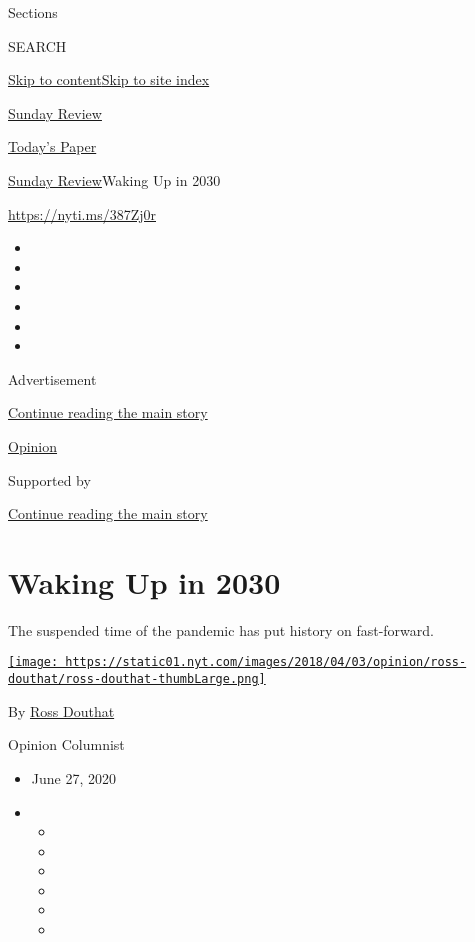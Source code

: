 Sections

SEARCH

\protect\hyperlink{site-content}{Skip to
content}\protect\hyperlink{site-index}{Skip to site index}

\href{https://www.nytimes.com/section/opinion/sunday}{Sunday Review}

\href{https://myaccount.nytimes.com/auth/login?response_type=cookie\&client_id=vi}{}

\href{https://www.nytimes.com/section/todayspaper}{Today's Paper}

\href{/section/opinion/sunday}{Sunday Review}\textbar{}Waking Up in 2030

\href{https://nyti.ms/387Zj0r}{https://nyti.ms/387Zj0r}

\begin{itemize}
\item
\item
\item
\item
\item
\item
\end{itemize}

Advertisement

\protect\hyperlink{after-top}{Continue reading the main story}

\href{/section/opinion}{Opinion}

Supported by

\protect\hyperlink{after-sponsor}{Continue reading the main story}

\hypertarget{waking-up-in-2030}{%
\section{Waking Up in 2030}\label{waking-up-in-2030}}

The suspended time of the pandemic has put history on fast-forward.

\href{https://www.nytimes.com/by/ross-douthat}{\texttt{[image: https://static01.nyt.com/images/2018/04/03/opinion/ross-douthat/ross-douthat-thumbLarge.png]}}

By \href{https://www.nytimes.com/by/ross-douthat}{Ross Douthat}

Opinion Columnist

\begin{itemize}
\item
  June 27, 2020
\item
  \begin{itemize}
  \item
  \item
  \item
  \item
  \item
  \item
  \end{itemize}
\end{itemize}

